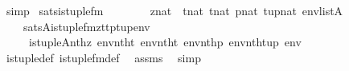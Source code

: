 \begin{isabellebody}
\ simp%
\endisatagproof
{\isafoldproof}%
%
\isadelimproof
\isanewline
%
\endisadelimproof
\isanewline
{}\isamarkupfalse%
\ sats{\isacharunderscore}{\kern0pt}is{\isacharunderscore}{\kern0pt}tuple{\isacharunderscore}{\kern0pt}fm\ {\isacharcolon}{\kern0pt}\isanewline
\ \ \isanewline
\ \ \ \ {\isachardoublequoteopen}z{\isasymin}nat{\isachardoublequoteclose}\ \ {\isachardoublequoteopen}t{}{\isasymin}nat{\isachardoublequoteclose}\ {\isachardoublequoteopen}t{}{\isasymin}nat{\isachardoublequoteclose}\ {\isachardoublequoteopen}p{\isasymin}nat{\isachardoublequoteclose}\ {\isachardoublequoteopen}tup{\isasymin}nat{\isachardoublequoteclose}\ {\isachardoublequoteopen}env{\isasymin}list{\isacharparenleft}{\kern0pt}A{\isacharparenright}{\kern0pt}{\isachardoublequoteclose}\isanewline
\ \ \isanewline
\ \ \ \ {\isachardoublequoteopen}sats{\isacharparenleft}{\kern0pt}A{\isacharcomma}{\kern0pt}is{\isacharunderscore}{\kern0pt}tuple{\isacharunderscore}{\kern0pt}fm{\isacharparenleft}{\kern0pt}z{\isacharcomma}{\kern0pt}t{}{\isacharcomma}{\kern0pt}t{}{\isacharcomma}{\kern0pt}p{\isacharcomma}{\kern0pt}tup{\isacharparenright}{\kern0pt}{\isacharcomma}{\kern0pt}env{\isacharparenright}{\kern0pt}\isanewline
\ \ \ \ {\isasymlongleftrightarrow}\ is{\isacharunderscore}{\kern0pt}tuple{\isacharparenleft}{\kern0pt}{\isacharhash}{\kern0pt}{\isacharhash}{\kern0pt}A{\isacharcomma}{\kern0pt}nth{\isacharparenleft}{\kern0pt}z{\isacharcomma}{\kern0pt}\ env{\isacharparenright}{\kern0pt}{\isacharcomma}{\kern0pt}nth{\isacharparenleft}{\kern0pt}t{}{\isacharcomma}{\kern0pt}\ env{\isacharparenright}{\kern0pt}{\isacharcomma}{\kern0pt}nth{\isacharparenleft}{\kern0pt}t{}{\isacharcomma}{\kern0pt}\ env{\isacharparenright}{\kern0pt}{\isacharcomma}{\kern0pt}nth{\isacharparenleft}{\kern0pt}p{\isacharcomma}{\kern0pt}\ env{\isacharparenright}{\kern0pt}{\isacharcomma}{\kern0pt}nth{\isacharparenleft}{\kern0pt}tup{\isacharcomma}{\kern0pt}\ env{\isacharparenright}{\kern0pt}{\isacharparenright}{\kern0pt}{\isachardoublequoteclose}\isanewline
%
\isadelimproof
\ \ %
\endisadelimproof
%
\isatagproof
{}\isamarkupfalse%
\ is{\isacharunderscore}{\kern0pt}tuple{\isacharunderscore}{\kern0pt}def\ is{\isacharunderscore}{\kern0pt}tuple{\isacharunderscore}{\kern0pt}fm{\isacharunderscore}{\kern0pt}def\ \isamarkupfalse%
\ assms\ \isamarkupfalse%
\ simp%
\endisatagproof
{\isafoldproof}%
%
\isadelimproof
\isanewline
%
\endisadelimproof
\isanewline
{}\isamarkupfalse%

\end{isabellebody}
